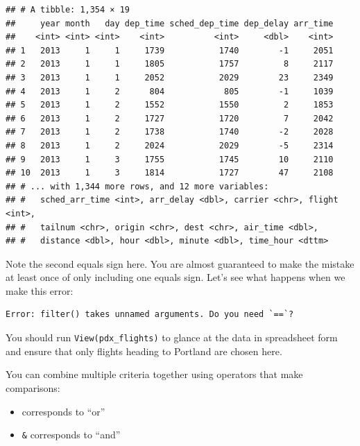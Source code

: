 \documentclass[]{tufte-book}
\newenvironment{Shaded}{\begin{snugshade}}{\end{snugshade}}
\newcommand{\KeywordTok}[1]{\textcolor[rgb]{0.13,0.29,0.53}{\textbf{{#1}}}}
\newcommand{\DataTypeTok}[1]{\textcolor[rgb]{0.13,0.29,0.53}{{#1}}}
\newcommand{\StringTok}[1]{\textcolor[rgb]{0.31,0.60,0.02}{{#1}}}
\newcommand{\NormalTok}[1]{{#1}}
\providecommand{\tightlist}{%
  \setlength{\itemsep}{0pt}\setlength{\parskip}{0pt}}
\begin{document}
\begin{verbatim}
## # A tibble: 1,354 × 19
##     year month   day dep_time sched_dep_time dep_delay arr_time
##    <int> <int> <int>    <int>          <int>     <dbl>    <int>
## 1   2013     1     1     1739           1740        -1     2051
## 2   2013     1     1     1805           1757         8     2117
## 3   2013     1     1     2052           2029        23     2349
## 4   2013     1     2      804            805        -1     1039
## 5   2013     1     2     1552           1550         2     1853
## 6   2013     1     2     1727           1720         7     2042
## 7   2013     1     2     1738           1740        -2     2028
## 8   2013     1     2     2024           2029        -5     2314
## 9   2013     1     3     1755           1745        10     2110
## 10  2013     1     3     1814           1727        47     2108
## # ... with 1,344 more rows, and 12 more variables:
## #   sched_arr_time <int>, arr_delay <dbl>, carrier <chr>, flight <int>,
## #   tailnum <chr>, origin <chr>, dest <chr>, air_time <dbl>,
## #   distance <dbl>, hour <dbl>, minute <dbl>, time_hour <dttm>
\end{verbatim}

Note the second equals sign here. You are almost guaranteed to make the
mistake at least once of only including one equals sign. Let's see what
happens when we make this error:

\begin{Shaded}
\end{Shaded}

\begin{verbatim}
Error: filter() takes unnamed arguments. Do you need `==`?
\end{verbatim}

You should run \texttt{View(pdx\_flights)} to glance at the data in
spreadsheet form and ensure that only flights heading to Portland are
chosen here.

You can combine multiple criteria together using operators that make
comparisons:

\begin{itemize}
\tightlist
\item
  \texttt{\textbar{}} corresponds to ``or''
\item
  \texttt{\&} corresponds to ``and''
\end{itemize}
\end{document}
